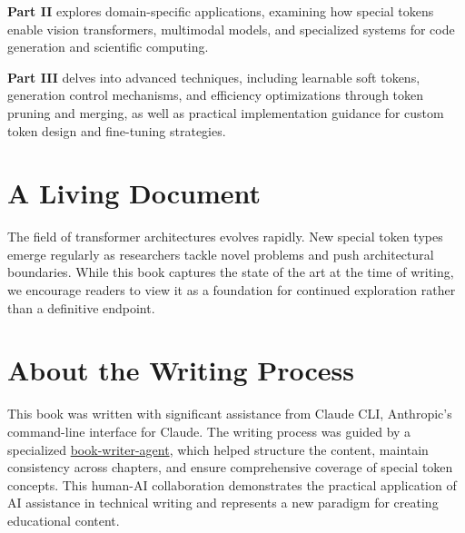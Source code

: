 \textbf{Part II} explores domain-specific applications, examining how special tokens enable vision transformers, multimodal models, and specialized systems for code generation and scientific computing.

\textbf{Part III} delves into advanced techniques, including learnable soft tokens, generation control mechanisms, and efficiency optimizations through token pruning and merging, as well as practical implementation guidance for custom token design and fine-tuning strategies.
\begin{comment}
Feedback: The description for Part III is a bit vague with "learnable soft tokens, generation control mechanisms". Can you be more specific? For example: "...delves into advanced techniques, such as using special tokens to steer text generation, implementing learnable 'soft prompts' for parameter-efficient fine-tuning, and optimizing inference speed through token pruning and merging."

STATUS: addressed - expanded Part III to include practical implementation content previously in Part IV
\end{comment}

\section*{A Living Document}

The field of transformer architectures evolves rapidly. New special token types emerge regularly as researchers tackle novel problems and push architectural boundaries. While this book captures the state of the art at the time of writing, we encourage readers to view it as a foundation for continued exploration rather than a definitive endpoint.
\begin{comment}
Feedback: This is a standard disclaimer. To make it more engaging, you could invite the reader to participate. For example: "We invite readers to join the conversation on the book's accompanying GitHub repository, where we will post updates and discuss new developments in the field." This turns a static statement into an active invitation.
\end{comment}

\section*{About the Writing Process}

This book was written with significant assistance from Claude CLI, Anthropic's command-line interface for Claude. The writing process was guided by a specialized \href{https://github.com/hfgong/book-writer-agent}{book-writer-agent}, which helped structure the content, maintain consistency across chapters, and ensure comprehensive coverage of special token concepts. This human-AI collaboration demonstrates the practical application of AI assistance in technical writing and represents a new paradigm for creating educational content.

